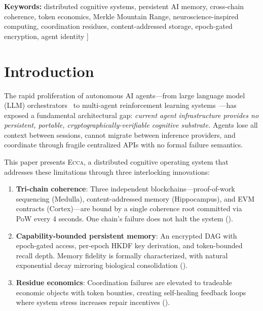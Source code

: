 \documentclass[11pt,twocolumn]{article}
\theoremstyle{definition}
\theoremstyle{plain}
\theoremstyle{remark}
\newcommand{\ecca}{\textsc{Ecca}}
\begin{document}
\noindent\textbf{\sffamily Keywords:} distributed cognitive systems, persistent AI memory, cross-chain coherence, token economics, Merkle Mountain Range, neuroscience-inspired computing, coordination residues, content-addressed storage, epoch-gated encryption, agent identity
\vspace{2em}
]

\section{Introduction}\label{sec:introduction}

The rapid proliferation of autonomous AI agents---from large language model (LLM) orchestrators~\cite{autogpt2023} to multi-agent reinforcement learning systems~\cite{lowe2017multi}---has exposed a fundamental architectural gap: \emph{current agent infrastructure provides no persistent, portable, cryptographically-verifiable cognitive substrate.} Agents lose all context between sessions, cannot migrate between inference providers, and coordinate through fragile centralized APIs with no formal failure semantics.

This paper presents \ecca{}, a distributed cognitive operating system that addresses these limitations through three interlocking innovations:

\begin{enumerate}[leftmargin=*,itemsep=2pt]
  \item \textbf{Tri-chain coherence}: Three independent blockchains---proof-of-work sequencing (Medulla), content-addressed memory (Hippocampus), and EVM contracts (Cortex)---are bound by a single coherence root committed via PoW every 4 seconds. One chain's failure does not halt the system ().
  \item \textbf{Capability-bounded persistent memory}: An encrypted DAG with epoch-gated access, per-epoch HKDF key derivation, and token-bounded recall depth. Memory fidelity is formally characterized, with natural exponential decay mirroring biological consolidation ().
  \item \textbf{Residue economics}: Coordination failures are elevated to tradeable economic objects with token bounties, creating self-healing feedback loops where system stress increases repair incentives ().
\end{enumerate}
\end{document}
